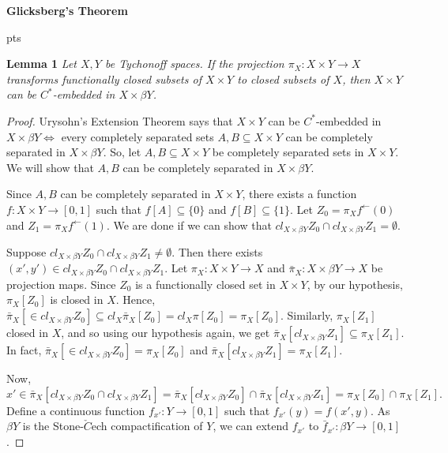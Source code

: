 \documentclass{amsart}
\author{shaun yi cheng}
\begin{document}
\begin{center}
\textbf{Glicksberg's Theorem}
\end{center}
 pts

\textbf{Lemma 1}
\emph{Let $X, Y$ be Tychonoff spaces. If the projection $\pi_X: X\times Y \rightarrow X$ transforms functionally closed subsets of $X\times Y$ to closed subsets of $X$, then $X\times Y$ can be $C^*$-embedded in $X\times \beta Y$.}


\begin{proof}Urysohn's Extension Theorem says that $X\times Y$ can be $C^*$-embedded in $X\times \beta Y \iff $ every completely separated sets $A,B \subseteq X\times Y$ can be completely separated in $X\times \beta Y.$ So, let $A, B \subseteq X\times Y$ be completely separated sets in $X\times Y$. We will show that $A,B$ can be completely separated in $X\times \beta Y.$

Since $A, B$ can be completely separated in $X\times Y$, there exists a function $f: X\times Y \rightarrow [0,1]$ such that $f[A]\subseteq \{0\} $ and $f[B]\subseteq \{1\}$. Let $Z_0=\pi_X f^\leftarrow (0)$ and $Z_1= \pi_X f^\leftarrow (1)$. We are done if we can show that $cl_{X\times \beta Y} Z_0 \cap cl_{X\times \beta Y}Z_1 = \emptyset.$



Suppose $cl_{X\times \beta Y} Z_0 \cap cl_{X\times \beta Y}Z_1 \neq \emptyset.$ Then there exists $(x',y') \in cl_{X\times \beta Y} Z_0 \cap cl_{X\times \beta Y}Z_1.$ Let $\pi_X: X\times Y \rightarrow X$ and $\bar{\pi}_X:X\times \beta Y \rightarrow X$ be projection maps. Since $Z_0$ is a functionally closed set in $X \times Y$, by our hypothesis, $\pi_X[Z_0]$ is closed in $X$. Hence, $\bar{\pi}_X[\in cl_{X\times \beta Y} Z_0] \subseteq cl_X \bar{\pi}_X[Z_0] = cl_X \pi[Z_0] = \pi_X[Z_0].$ Similarly, $\pi_X [Z_1]$ closed in $X$, and so using our hypothesis again, we get $\bar{\pi}_X[ cl_{X\times \beta Y} Z_1] \subseteq  \pi_X[Z_1]$. In fact, $\bar{\pi}_X[\in cl_{X\times \beta Y} Z_0]= \pi_X[Z_0]$ and $\bar{\pi}_X[ cl_{X\times \beta Y} Z_1] =  \pi_X[Z_1]$. 

Now, $x' \in \bar{\pi}_X[ cl_{X\times \beta Y} Z_0 \cap cl_{X\times \beta Y}Z_1]=\bar{\pi}_X[ cl_{X\times \beta Y} Z_0]  \cap \bar{\pi}_X[cl_{X\times \beta Y}Z_1] = \pi_X[Z_0] \cap \pi_X[Z_1].$ Define a continuous function $f_{x'}:Y\rightarrow [0,1]$ such that $f_{x'}(y)=f(x',y).$ As $\beta Y$ is the Stone-$\check{C}$ech compactification of $Y$, we can extend $f_{x'}$ to $\bar{f}_{x'}:\beta Y \rightarrow [0,1]$.


\end{proof}
\end{document}
